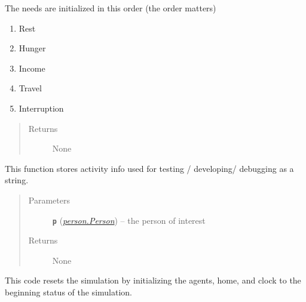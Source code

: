 \documentclass[letterpaper,10pt,english]{sphinxmanual}
\begin{document}
\begin{fulllineitems}
\begin{fulllineitems}
The needs are initialized in this order (the order matters)
\begin{enumerate}
\item {} 
Rest

\item {} 
Hunger

\item {} 
Income

\item {} 
Travel

\item {} 
Interruption

\end{enumerate}
\begin{quote}\begin{description}
\item[{Returns}] \leavevmode
None

\end{description}\end{quote}

\end{fulllineitems}


\begin{fulllineitems}
\label{universe:universe.Universe.print_activity_info}
This function stores activity info used for testing / developing/ debugging as a string.
\begin{quote}\begin{description}
\item[{Parameters}] \leavevmode
\textbf{\texttt{p}} ({\hyperref[person:person.Person]{\emph{\emph{person.Person}}}}) -- the person of interest

\item[{Returns}] \leavevmode
None

\end{description}\end{quote}

\end{fulllineitems}


\begin{fulllineitems}
\label{universe:universe.Universe.reset}
This code resets the simulation by initializing the agents, home, and clock to the beginning status         of the simulation.


\end{fulllineitems}
\end{fulllineitems}
\end{document}
